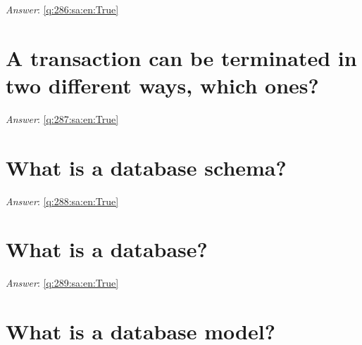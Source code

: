 \documentclass[a4paper,11pt,oneside]{book}
\begin{document}
\begin{sloppypar}
\noindent\makebox[\textwidth]{\hrulefill}

\vspace{1cm}

\textit{Answer}: \autoref{q:286:sa:en:True}



\section{A transaction can be terminated in two different ways, which ones?}

\label{q:287:sa:en:False}

\vspace{2cm}

\noindent\makebox[\textwidth]{\hrulefill}

\vspace{1cm}

\textit{Answer}: \autoref{q:287:sa:en:True}



\section{What is a database schema?}

\label{q:288:sa:en:False}

\vspace{2cm}

\noindent\makebox[\textwidth]{\hrulefill}

\vspace{1cm}

\textit{Answer}: \autoref{q:288:sa:en:True}



\section{What is a database?}

\label{q:289:sa:en:False}

\vspace{2cm}

\noindent\makebox[\textwidth]{\hrulefill}

\vspace{1cm}

\textit{Answer}: \autoref{q:289:sa:en:True}



\section{What is a database model?}


\end{sloppypar}
\end{document}
